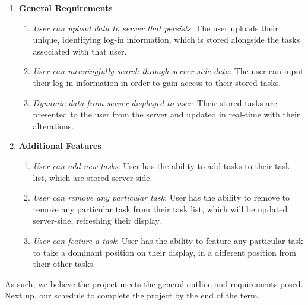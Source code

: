 \documentclass[10pt, letterpaper]{article}
\let\tab\quad
\begin{document}
\begin{enumerate}
	\item \textbf{General Requirements}
	\begin{enumerate}
		\item \emph{User can upload data to server that persists}: The user uploads their unique, identifying log-in information, which is stored alongside the tasks associated with that user.
		\item \emph{User can meaningfully search through server-side data}: The user can input their log-in information in order to gain access to their stored tasks.
		\item \emph{Dynamic data from server displayed to user}: Their stored tasks are presented to the user from the server and updated in real-time with their alterations.
	\end{enumerate}
	\item \textbf{Additional Features}
	\begin{enumerate}
			\item \emph{User can add new tasks}: User has the ability to add tasks to their task list, which are stored server-side.
		\item \emph{User can remove any particular task}: User has the ability to remove to remove any particular task from their task list, which will be updated server-side, refreshing their display.
		\item \emph{User can feature a task}: User has the ability to feature any particular task to take a dominant position on their display, in a different position from their other tasks.
	\end{enumerate}
\end{enumerate}

\tab As such, we believe the project meets the general outline and requirements posed. Next up, our schedule to complete the project by the end of the term.
\end{document}
